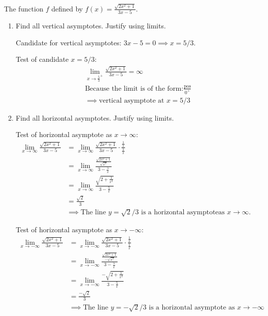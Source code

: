 \documentclass[nooutcomes]{ximera}
\begin{document}
\begin{problem}
The function $f$ defined by $\displaystyle f(x) = \frac{\sqrt{2x^2 + 1}}{3x-5}$.
  \begin{enumerate}
    \item
      Find all vertical asymptotes.  Justify using limits.
 \begin{freeResponse}
        Candidate for vertical asymptotes: $3x - 5 = 0 \implies x = 5/3$.

        Test of candidate $x = 5/3$:
        \begin{align*}
          &\lim_{x \to \frac{5}{3}^+} \frac{\sqrt{2x^2 + 1}}{3x-5} = \infty\\
	&\text{Because the limit is of the form:} \frac{\text{pos}}{0^+}\\
          &\implies \mbox{vertical asymptote at $x = 5/3$}
        \end{align*}

       \end{freeResponse}

    \item
      Find all horizontal asymptotes.  Justify using limits.
 

        \begin{freeResponse}
        Test of horizontal asymptote as $x \to \infty$:
        \begin{align*}
          \lim_{x \to \infty} \frac{\sqrt{2x^2 + 1}}{3x-5}
          &= \lim_{x \to \infty} \frac{\sqrt{2x^2 + 1}}{3x-5} \cdot \frac{\frac{1}{x}}{\frac{1}{x}} \\
          &= \lim_{x \to \infty}  \frac{\frac{\sqrt{2x^2 + 1}}{\sqrt{x^2}}}{3 - \frac{5}{x}}\\
          &= \lim_{x \to \infty}  \frac{\sqrt{2 + \frac{1}{x^2}}}{3 - \frac{5}{x}} \\
          &= \frac{\sqrt{2}}{3} \\
          &\implies \mbox{The line $y = \sqrt{2}/3$ is a horizontal asymptoteas $x \to \infty$.}
        \end{align*}

        Test of horizontal asymptote as $x \to -\infty$:
        \begin{align*}
          \lim_{x \to -\infty} \frac{\sqrt{2x^2 + 1}}{3x-5}
          &= \lim_{x \to -\infty} \frac{\sqrt{2x^2 + 1}}{3x-5} \cdot \frac{\frac{1}{x}}{\frac{1}{x}} \\
          &= \lim_{x \to -\infty}  \frac{\frac{\sqrt{2x^2 + 1}}{-\sqrt{x^2}}}{3 - \frac{5}{x}}\\
          &= \lim_{x \to -\infty}  \frac{-\sqrt{2 + \frac{1}{x^2}}}{3 - \frac{5}{x}} \\
          &= \frac{-\sqrt{2}}{3} \\
          &\implies \mbox{The line $y = -\sqrt{2}/3$ is a horizontal asymptote as $x \to -\infty$}
        \end{align*}
	
      \end{freeResponse}
 \end{enumerate}

    
\end{problem}
\end{document}
